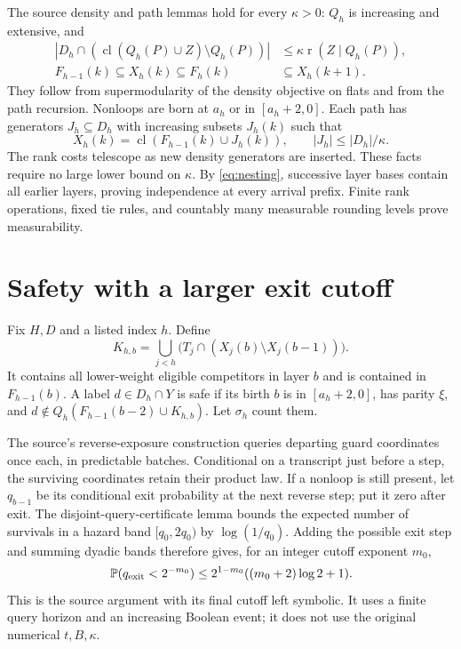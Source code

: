 \documentclass[11pt]{article}
\DeclareMathOperator{\cl}{cl}
\DeclareMathOperator{\rk}{r}
\newcommand{\Prb}{\mathbb P}
\begin{document}
The source density and path lemmas hold for every $\kappa>0$:
$Q_h$ is increasing and extensive, and
\begin{align}
 |D_h\cap(\cl(Q_h(P)\cup Z)\setminus Q_h(P))|
   &\le\kappa\rk(Z\mid Q_h(P)),\label{eq:density}\\
 F_{h-1}(k)\subseteq X_h(k)\subseteq F_h(k)&\subseteq X_h(k+1).
 \label{eq:nesting}
\end{align}
They follow from supermodularity of the density objective on flats
and from the path recursion. Nonloops are born at $a_h$ or in
$[a_h+2,0]$. Each path has generators $J_h\subseteq D_h$ with
increasing subsets $J_h(k)$ such that
\begin{equation}\label{eq:generators}
 X_h(k)=\cl(F_{h-1}(k)\cup J_h(k)),\qquad
 |J_h|\le |D_h|/\kappa.
\end{equation}
The rank costs telescope as new density generators are inserted.
These facts require no large lower bound on $\kappa$.
By \eqref{eq:nesting}, successive layer bases contain all earlier
layers, proving independence at every arrival prefix. Finite rank
operations, fixed tie rules, and countably many measurable rounding
levels prove measurability.

\section{Safety with a larger exit cutoff}

Fix $H,D$ and a listed index $h$. Define
\[
 K_{h,b}=\bigcup_{j<h}\bigl(T_j\cap(X_j(b)\setminus X_j(b-1))\bigr).
\]
It contains all lower-weight eligible competitors in layer $b$ and
is contained in $F_{h-1}(b)$. A label $d\in D_h\cap Y$ is safe if its
birth $b$ is in $[a_h+2,0]$, has parity $\xi$, and
$d\notin Q_h(F_{h-1}(b-2)\cup K_{h,b})$. Let $\sigma_h$ count them.

The source's reverse-exposure construction queries departing guard
coordinates once each, in predictable batches. Conditional on a
transcript just before a step, the surviving coordinates retain their
product law. If a nonloop is still present, let $q_{b-1}$ be its
conditional exit probability at the next reverse step; put it zero
after exit. The disjoint-query-certificate lemma bounds the expected
number of survivals in a hazard band $[q_0,2q_0)$ by
$\log(1/q_0)$. Adding the possible exit step and summing dyadic bands
therefore gives, for an integer cutoff exponent $m_0$,
\begin{equation}\label{eq:hazard}
 \Prb(q_{\rm exit}<2^{-m_0})
 \le 2^{1-m_0}((m_0+2)\log2+1).
\end{equation}
This is the source argument with its final cutoff left symbolic. It
uses a finite query horizon and an increasing Boolean event; it does
not use the original numerical $t,B,\kappa$.
\end{document}
